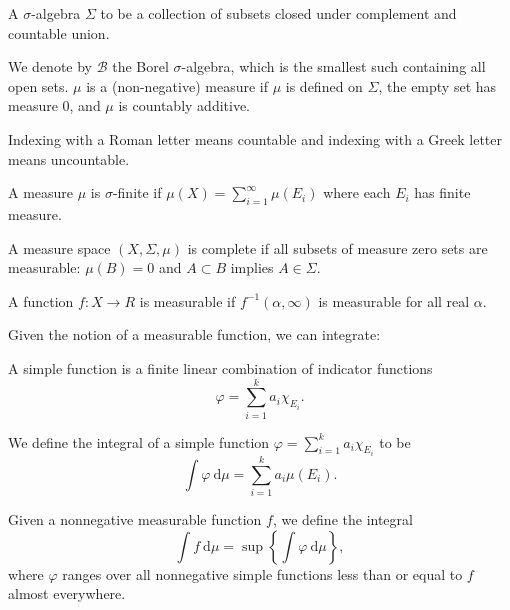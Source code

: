 \documentclass[10pt, twoside]{article}
\begin{document}
    \begin{defn}
        A $\sigma$-algebra $\Sigma$ to be a collection of subsets closed under complement and countable union.
    \end{defn}

     We denote by $\mathcal{B}$ the Borel $\sigma$-algebra, which is the smallest such containing all open sets. $\mu$ is a (non-negative) measure if $\mu$ is defined on $\Sigma$, the empty set has measure $0$, and $\mu$ is countably additive. 

    \begin{rmk}[Notation]
        Indexing with a Roman letter means countable and indexing with a Greek letter means uncountable.
    \end{rmk}

    \begin{defn}
        A measure $\mu$ is $\sigma$-finite if $\mu(X) = \sum_{i=1}^{\infty} \mu(E_i)$ where each $E_i$ has finite measure.
    \end{defn}

    \begin{defn}[Completeness]
        A measure space $(X,\Sigma, \mu)$ is complete if all subsets of measure zero sets are measurable: $\mu(B) = 0$ and $A \subset B$ implies $A \in \Sigma$.
    \end{defn}

    \begin{defn}
        A function $f: X \rightarrow R$ is measurable if $f^{-1}(\alpha, \infty)$ is measurable for all real $\alpha$.
    \end{defn}

    Given the notion of a measurable function, we can integrate:

    \begin{defn}
        A simple function is a finite linear combination of indicator functions \[ \varphi = \sum_{i=1}^k a_i\chi_{E_i}. \]
    \end{defn}

    We define the integral of a simple function $\varphi = \sum_{i=1}^k a_i \chi_{E_i}$ to be \[\int \varphi\ \mathrm{d}\mu = \sum_{i=1}^k a_i \mu(E_i).  \]

    Given a nonnegative measurable function $f$, we define the integral \[\int f\ \mathrm{d}\mu = \sup\left\{\int \varphi\ \mathrm{d} \mu\right\},\] where $\varphi$ ranges over all nonnegative simple functions less than or equal to $f$ almost everywhere.
\end{document}
